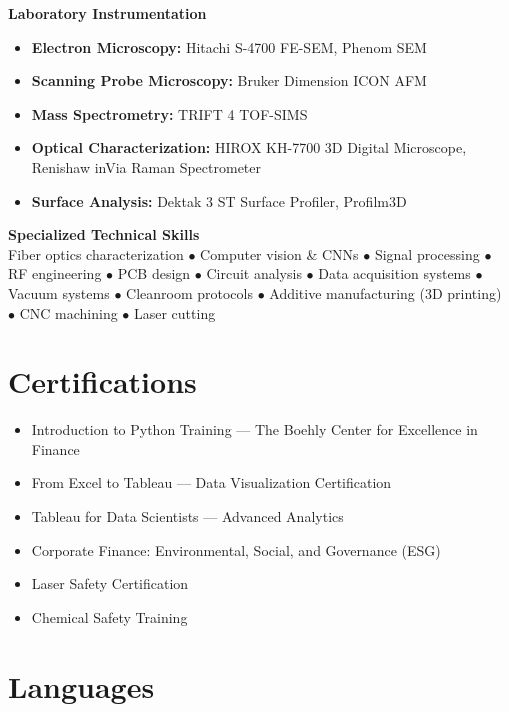 \documentclass[11pt,letterpaper]{article}
\begin{document}
\vspace{6pt}
\noindent
\textbf{Laboratory Instrumentation}
\begin{itemize}
    \item \textbf{Electron Microscopy:} Hitachi S-4700 FE-SEM, Phenom SEM
    \item \textbf{Scanning Probe Microscopy:} Bruker Dimension ICON AFM
    \item \textbf{Mass Spectrometry:} TRIFT 4 TOF-SIMS
    \item \textbf{Optical Characterization:} HIROX KH-7700 3D Digital Microscope, Renishaw inVia Raman Spectrometer
    \item \textbf{Surface Analysis:} Dektak 3 ST Surface Profiler, Profilm3D
\end{itemize}

\vspace{6pt}
\noindent
\textbf{Specialized Technical Skills}\\
Fiber optics characterization $\bullet$ Computer vision \& CNNs $\bullet$ Signal processing $\bullet$ RF engineering $\bullet$ PCB design $\bullet$ Circuit analysis $\bullet$ Data acquisition systems $\bullet$ Vacuum systems $\bullet$ Cleanroom protocols $\bullet$ Additive manufacturing (3D printing) $\bullet$ CNC machining $\bullet$ Laser cutting

\section{Certifications}

\begin{itemize}
    \item Introduction to Python Training — The Boehly Center for Excellence in Finance
    \item From Excel to Tableau — Data Visualization Certification
    \item Tableau for Data Scientists — Advanced Analytics
    \item Corporate Finance: Environmental, Social, and Governance (ESG)
    \item Laser Safety Certification
    \item Chemical Safety Training
\end{itemize}

\section{Languages}
\end{document}
